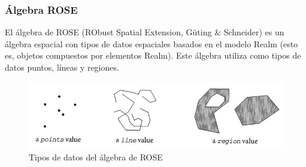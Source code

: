 \documentclass[a4paper,12pt,oneside]{report}
\begin{document}
\subsubsection*{\'Algebra ROSE}
El \'algebra de ROSE (RObust Spatial Extension, G\"uting \& Schneider) es un \'algebra espacial con tipos de datos espaciales basados en el modelo Realm (esto es, objetos compuestos por elementos Realm).
Este \'algebra utiliza como tipos de datos puntos, l\'ineas y regiones.\\
\begin{figure}[h]
\caption{Tipos de datos del \'algebra de ROSE}
\begin{center}
\includegraphics[scale=0.4]{Imagenes/5.png}
\end{center}
\end{figure}
\end{document}
